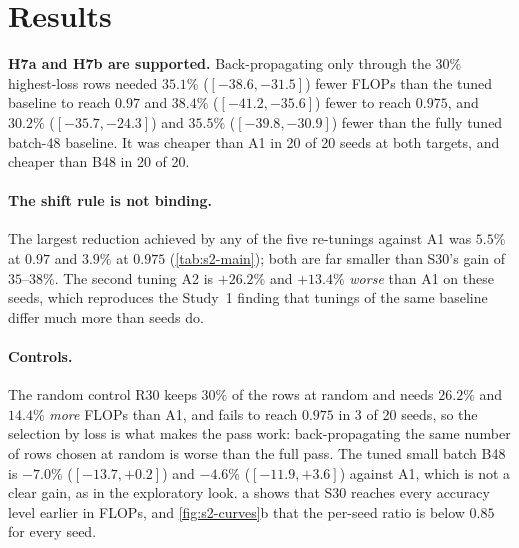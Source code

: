 \section{Results}\label{sec:s2-results}
\begin{table}[t]
\centering\small
\caption{Study 2: mean GFLOPs-to-target, mean steps among the runs that reached the target, runs that never reached it, and paired change against A1 ($97.5\%$ bootstrap intervals), 20 seeds per group. Steps of B48 are steps at batch 48 (8\,000-step horizon) and are not comparable with the others. S20, S30T and R30 are descriptive.}
\label{tab:s2-main}
\end{table}

\begin{keyfinding}
\textbf{H7a and H7b are supported.} Back-propagating only through the $30\%$ highest-loss rows needed $35.1\%$ ($[-38.6,-31.5]$) fewer FLOPs than the tuned baseline to reach $0.97$ and $38.4\%$ ($[-41.2,-35.6]$) fewer to reach $0.975$, and $30.2\%$ ($[-35.7,-24.3]$) and $35.5\%$ ($[-39.8,-30.9]$) fewer than the fully tuned batch-48 baseline. It was cheaper than A1 in 20 of 20 seeds at both targets, and cheaper than B48 in 20 of 20.
\end{keyfinding}

\paragraph{The shift rule is not binding.} The largest reduction achieved by any of the five re-tunings against A1 was $5.5\%$ at $0.97$ and $3.9\%$ at $0.975$ (\cref{tab:s2-main}); both are far smaller than S30's gain of $35$--$38\%$. The second tuning A2 is $+26.2\%$ and $+13.4\%$ \emph{worse} than A1 on these seeds, which reproduces the Study~1 finding that tunings of the same baseline differ much more than seeds do.

\paragraph{Controls.} The random control R30 keeps $30\%$ of the rows at random and needs $26.2\%$ and $14.4\%$ \emph{more} FLOPs than A1, and fails to reach $0.975$ in 3 of 20 seeds, so the selection by loss is what makes the pass work: back-propagating the same number of rows chosen at random is worse than the full pass. The tuned small batch B48 is $-7.0\%$ ($[-13.7,+0.2]$) and $-4.6\%$ ($[-11.9,+3.6]$) against A1, which is not a clear gain, as in the exploratory look. a shows that S30 reaches every accuracy level earlier in FLOPs, and \cref{fig:s2-curves}b that the per-seed ratio is below $0.85$ for every seed.

